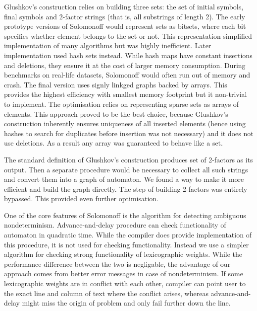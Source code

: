 \documentclass[12pt]{article}
\begin{document}
Glushkov's construction relies on building three sets: the set of initial symbols, final symbols and 2-factor strings (that is, all substrings of length 2). The early prototype versions of Solomonoff would represent sets as bitsets, where each bit specifies whether element belongs to the set or not. This representation simplified implementation of many algorithms but was highly inefficient. Later implementation used hash sets instead. While hash maps have constant insertions and deletions, they ensure it at the cost of larger memory consumption. During benchmarks on real-life datasets, Solomonoff would often run out of memory and crash.  The final version uses signly linkged graphs backed by arrays. This provides the highest efficiency with smallest memory footprint but it non-trivial to implement. The optimisation relies on representing sparse sets as arrays of elements. This approach proved to be the best choice, because Glushkov's construction inherently ensures uniqueness of all inserted elements (hence using hashes to search for duplicates before insertion was not necessary)  and it does not use deletions. As a result any array was guaranteed to behave like a set.

The standard definition of Glushkov's construction produces set of 2-factors as its output. Then a separate procedure would be necessary to collect all such strings and convert them into a graph of automaton. We found a way to make it more efficient and build the graph directly. The step of building 2-factors was entirely bypassed. This provided even further optimisation.

One of the core features of Solomonoff is the algorithm for detecting ambiguous nondeterminism. Advance-and-delay procedure can check functionality of automaton in quadratic time. While the compiler does provide implementation of this procedure, it is not used for checking functionality. Instead we use a simpler algorithm for checking strong functionality of lexicographic weights. While the performance difference between the two is negligable, the advantage of our approach comes from  better error messages in case of nondeterminism. If some lexicographic weights are in conflict with each other, compiler can point user to the exact line and column of text where the conflict arises, whereas advance-and-delay might miss the origin of problem and only fail further down the line.



    
\end{document}

